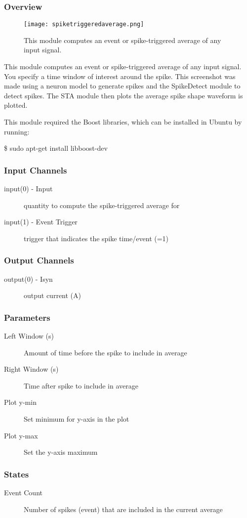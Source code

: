 \subsubsection{Overview}
\label{Spike-triggered Average}

\begin{figure}[h]
\begin{center}
\texttt{[image: spiketriggeredaverage.png]} 
\caption[Spike-triggered Average]{This module computes an event or spike-triggered average of any input signal.} 
\end{center}
\label{spiketriggeredaverage}
\end{figure}

This module computes an event or spike-triggered average of any input signal. You specify a time window of interest around the spike. This screenshot was made using a neuron model to generate spikes and the SpikeDetect module to detect spikes. The STA module then plots the average spike shape waveform is plotted.

This module required the Boost libraries, which can be installed in Ubuntu by running:
\begin{example}
\$ sudo apt-get install libboost-dev
\end{example}

\subsubsection{Input Channels}
\begin{description}
\item[input(0) - Input] quantity to compute the spike-triggered average for
\item[input(1) - Event Trigger] trigger that indicates the spike time/event (=1)
\end{description}

\subsubsection{Output Channels}
\begin{description}
\item[output(0) - Isyn] output current (A)
\end{description}

\subsubsection{Parameters}
\begin{description}
\item[Left Window (s)] Amount of time before the spike to include in average
\item[Right Window (s)] Time after spike to include in average
\item[Plot y-min] Set minimum for y-axis in the plot
\item[Plot y-max] Set the y-axis maximum
\end{description}

\subsubsection{States}
\begin{description}
\item[Event Count] Number of spikes (event) that are included in the current average
\end{description}